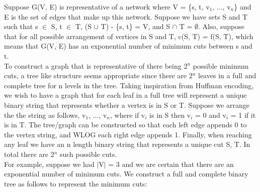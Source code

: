 \documentclass[10pt]{csc_assignment}
\begin{document}
\begin{description}

\newpage
\item[Q1.]

Suppose G(V, E) is representative of a network where V = \{s, t, v$_{1}$, ..., v$_{n}$\} 
and E is the set of edges that make up this network. Suppose we have sets S and T such that
s $\in$ S, t $\in$ T, (S $\cup$ T) - \{s, t\} = V, and S $\cap$ T = $\emptyset$. Also, 
suppose that for all possible arrangement of vertices in S and T, c(S, T) = f(S, T), which means that G(V, E) has an exponential number of minimum cuts between s and t.\\

To construct a graph that is representative of there being 2$^{n}$ possible minimum cuts, a tree
like structure seems appropriate since there are 2$^{n}$ leaves in a full and complete tree for n levels in the tree. Taking inspiration from Huffman encoding, we wish to have a graph that for each leaf in a full tree will represent a unique binary string that represents whether a vertex is in S or T. Suppose we arrange the the string as follows, v$_{1}$, ..., v$_{n}$, where if v$_{i}$ is in S then v$_{i}$ = 0 and v$_{i}$ = 1 if it is in T. The tree/graph can be constructed so that each left edge appends 0 to the vertex string, and WLOG each right edge appends 1. Finally, when reaching any leaf we have an n length binary string that represents a unique cut S, T. In total there are 2$^{n}$ such possible cuts.\\ 

For example, suppose we had $\mid$V$\mid$ = 3 and we are certain that there are an exponential number of minimum cuts. We construct a full and complete binary tree as follows to represent the minimum cuts:\\


\end{description}
\end{document}
